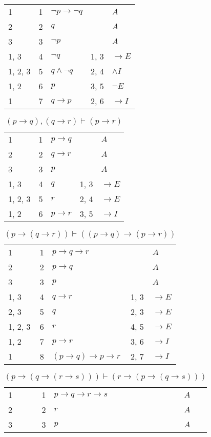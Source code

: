 \documentclass{article}
\begin{document}
\begin{table}[htbp]
\begin{tabular}{lrlll}
{1} & 1 & $¬p→ ¬q$ & {} & $A$ \\
{2} & 2 & $q$ & {} & $A$ \\
{3} & 3 & $¬p$ & {} & $A$ \\
{1, 3} & 4 & $¬q$ & {1, 3} & $→E$ \\
{1, 2, 3} & 5 & $q∧ ¬q$ & {2, 4} & $∧I$ \\
{1, 2} & 6 & $p$ & {3, 5} & $¬E$ \\
{1} & 7 & $q→p$ & {2, 6} & $→I$ \\
\end{tabular}
\end{table}\begin{table}[htbp]\caption*{$(p → q),(q → r) ⊢ (p → r)$}\centering\begin{tabular}{lrlll}
{1} & 1 & $p→q$ & {} & $A$ \\
{2} & 2 & $q→r$ & {} & $A$ \\
{3} & 3 & $p$ & {} & $A$ \\
{1, 3} & 4 & $q$ & {1, 3} & $→E$ \\
{1, 2, 3} & 5 & $r$ & {2, 4} & $→E$ \\
{1, 2} & 6 & $p→r$ & {3, 5} & $→I$ \\
\end{tabular}
\end{table}\begin{table}[htbp]\caption*{$(p → (q → r)) ⊢ ((p → q) → (p → r))$}\centering\begin{tabular}{lrlll}
{1} & 1 & $p→q→r$ & {} & $A$ \\
{2} & 2 & $p→q$ & {} & $A$ \\
{3} & 3 & $p$ & {} & $A$ \\
{1, 3} & 4 & $q→r$ & {1, 3} & $→E$ \\
{2, 3} & 5 & $q$ & {2, 3} & $→E$ \\
{1, 2, 3} & 6 & $r$ & {4, 5} & $→E$ \\
{1, 2} & 7 & $p→r$ & {3, 6} & $→I$ \\
{1} & 8 & $(p→q)→p→r$ & {2, 7} & $→I$ \\
\end{tabular}
\end{table}\begin{table}[htbp]\caption*{$(p → (q → (r → s))) ⊢ (r → (p → (q → s)))$}\centering\begin{tabular}{lrlll}
{1} & 1 & $p→q→r→s$ & {} & $A$ \\
{2} & 2 & $r$ & {} & $A$ \\
{3} & 3 & $p$ & {} & $A$ \\

\end{tabular}
\end{table}
\end{document}

